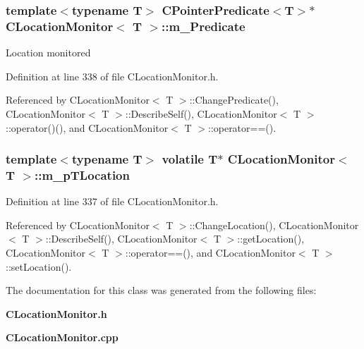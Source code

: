 \subsubsection{\setlength{\rightskip}{0pt plus 5cm}template$<$typename T$>$ {\bf CPointer\-Predicate}$<$T$>$$\ast$ CLocation\-Monitor$<$ T $>$::m\_\-Predicate\hspace{0.3cm}{\tt  [private]}}\label{classCLocationMonitor_o1}


Location monitored 

Definition at line 338 of file CLocation\-Monitor.h.

Referenced by CLocation\-Monitor$<$ T $>$::Change\-Predicate(), CLocation\-Monitor$<$ T $>$::Describe\-Self(), CLocation\-Monitor$<$ T $>$::operator()(), and CLocation\-Monitor$<$ T $>$::operator==().
\subsubsection{\setlength{\rightskip}{0pt plus 5cm}template$<$typename T$>$ volatile T$\ast$ CLocation\-Monitor$<$ T $>$::m\_\-p\-TLocation\hspace{0.3cm}{\tt  [private]}}\label{classCLocationMonitor_o0}




Definition at line 337 of file CLocation\-Monitor.h.

Referenced by CLocation\-Monitor$<$ T $>$::Change\-Location(), CLocation\-Monitor$<$ T $>$::Describe\-Self(), CLocation\-Monitor$<$ T $>$::get\-Location(), CLocation\-Monitor$<$ T $>$::operator==(), and CLocation\-Monitor$<$ T $>$::set\-Location().

The documentation for this class was generated from the following files:\begin{CompactItemize}
\item 
{\bf CLocation\-Monitor.h}\item 
{\bf CLocation\-Monitor.cpp}\end{CompactItemize}
